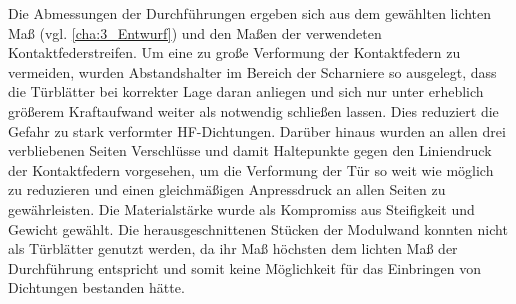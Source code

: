 

Die Abmessungen der Durchführungen ergeben sich aus dem gewählten lichten Maß (vgl. \Abschnitt\ref{cha:3_Entwurf}) und den Maßen der verwendeten Kontaktfederstreifen. Um eine zu große Verformung der Kontaktfedern zu vermeiden, wurden Abstandshalter im Bereich der Scharniere so ausgelegt, dass die Türblätter bei korrekter Lage daran anliegen und sich nur unter erheblich größerem Kraftaufwand weiter als notwendig schließen lassen. Dies reduziert die Gefahr zu stark verformter HF-Dichtungen. Darüber hinaus wurden an allen drei verbliebenen Seiten Verschlüsse und damit Haltepunkte gegen den Liniendruck der Kontaktfedern vorgesehen, um die Verformung der Tür so weit wie möglich zu reduzieren und einen gleichmäßigen Anpressdruck an allen Seiten zu gewährleisten. Die Materialstärke wurde als Kompromiss aus Steifigkeit und Gewicht gewählt. Die herausgeschnittenen Stücken der Modulwand konnten nicht als Türblätter genutzt werden, da ihr Maß höchsten dem lichten Maß der Durchführung entspricht und somit keine Möglichkeit für das Einbringen von Dichtungen bestanden hätte.
\par
\vspace{\linespace}



